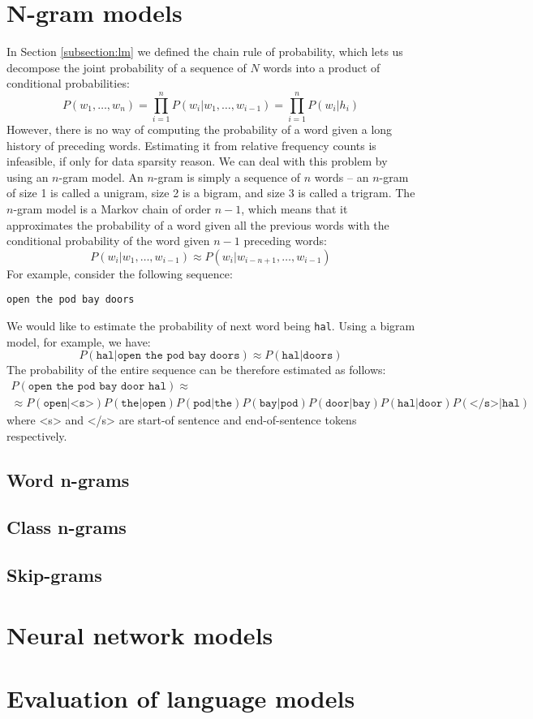 \section{N-gram models}
\label{section:ngrams}
In Section \ref{subsection:lm} we defined the chain rule of probability, which lets us decompose the joint probability of a sequence of $N$ words into a product of conditional probabilities:
\begin{equation}
	P(w_{1}, \dots, w_{n})=\prod_{i=1}^{n}P(w_{i}|w_{1},\dots,w_{i-1})=\prod_{i=1}^{n}P(w_{i}|h_{i})
\end{equation}
However, there is no way of computing the probability of a word given a long history of preceding words. Estimating it from relative frequency counts is infeasible, if only for data sparsity reason. We can deal with this problem by using an $n$-gram model. An $n$-gram is simply a sequence of $n$ words -- an $n$-gram of size 1 is called a unigram, size 2 is a bigram, and size 3 is called a trigram. The $n$-gram model is a Markov chain of order $n-1$, which means that it approximates the probability of a word given all the previous words with the conditional probability of the word given $n-1$ preceding words:
\begin{equation}
	P(w_{i}|w_{1},\dots,w_{i-1})\approx P(w_{i}|w_{i-n+1},\dots,w_{i-1})
\end{equation}
For example, consider the following sequence:
\begin{center}
\texttt{open the pod bay doors}  
\end{center}
We would like to estimate the probability of next word being \texttt{hal}. Using a bigram model, for example, we have:
\begin{equation}
	P(\texttt{hal}|\texttt{open the pod bay doors}) \approx P(\texttt{hal}|\texttt{doors})
\end{equation}
The probability of the entire sequence can be therefore estimated as follows:
\begin{multline}
	P(\texttt{open the pod bay door hal}) \approx \\
	\approx P(\texttt{open}|\texttt{<s>})P(\texttt{the}|\texttt{open})P(\texttt{pod}|\texttt{the})P(\texttt{bay}|\texttt{pod})P(\texttt{door}|\texttt{bay})P(\texttt{hal}|\texttt{door})P(\texttt{</s>}|\texttt{hal})
\end{multline}
where <s> and </s> are start-of sentence and end-of-sentence tokens respectively.
\subsection{Word n-grams}
\subsection{Class n-grams}
\label{subsection:class}
\subsection{Skip-grams}

\section{Neural network models}
\label{section:ann}
\section{Evaluation of language models}
\label{section:evaluation}


